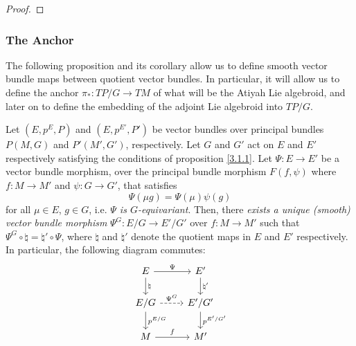 \begin{proof}
\end{proof}

\subsubsection{The Anchor}

The following proposition and its corollary allow us to define smooth vector bundle maps between quotient vector bundles. In particular, it will allow us to define the anchor $\pi_*:TP/G \to TM$ of what will be the Atiyah Lie algebroid, and later on to define the embedding of the adjoint Lie algebroid into $TP/G$.

\begin{proposition} \label{3.1.2}
Let $(E, p^E, P)$ and $(E, p^{E'}, P')$ be vector bundles over principal bundles $P(M, G)$ and $P'(M', G')$, respectively. Let $G$ and $G'$ act on $E$ and $E'$ respectively satisfying the conditions of proposition \ref{3.1.1}. Let $\Psi: E \to E'$ be a vector bundle morphism, over the principal bundle morphism $F(f, \psi)$ where $f:M\to M'$ and $\psi:G \to G'$, that satisfies \[\Psi(\mu g) = \Psi(\mu) \psi(g)\] for all $\mu \in E$, $g \in G$, i.e. \emph{$\Psi$ is $G$-equivariant}. Then, there \emph{exists a unique (smooth) vector bundle morphism} $\Psi^{G}: E/G \to E'/G'$ over $f: M \to M'$ such that $\Psi^{G} \circ \natural = \natural' \circ \Psi$, where $\natural$ and $\natural'$ denote the quotient maps in $E$ and $E'$ respectively. In particular, the following diagram commutes:
\begin{equation} \label{diagramQuotientMorph}
\begin{tikzcd}
    E   \ar{r}{\Psi}     \ar{d}{\natural} &   E'  \ar{d}{\natural'} \\
    E/G \ar[dashed]{r}{\Psi^{G}} \ar{d}{p^{E/G}}  & E'/G' \ar{d}{p^{E'/G'}} \\
    M \ar{r}{f} & M'
\end{tikzcd}
\end{equation}
\end{proposition}

